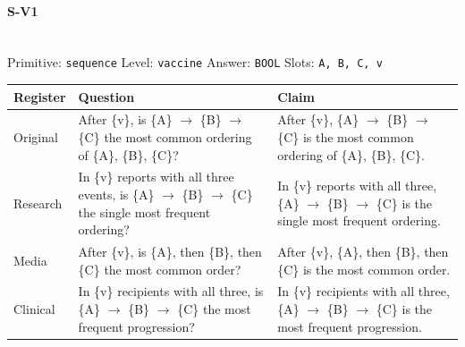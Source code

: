 \documentclass[11pt]{article}
\begin{document}
\paragraph{\textbf{S-V1}}\mbox{}\\
Primitive: \texttt{sequence} \quad Level: \texttt{vaccine} \quad Answer: \texttt{BOOL} \quad Slots: \texttt{A, B, C, v}\\[2pt]
\begin{tabularx}{\linewidth}{@{}l L L@{}}
\toprule
\textbf{Register} & \textbf{Question} & \textbf{Claim} \\
\midrule
Original & After \{v\}, is \{A\} $\rightarrow$  \{B\} $\rightarrow$  \{C\} the most common ordering of \{A\}, \{B\}, \{C\}? & After \{v\}, \{A\} $\rightarrow$  \{B\} $\rightarrow$  \{C\} is the most common ordering of \{A\}, \{B\}, \{C\}. \\
Research & In \{v\} reports with all three events, is \{A\} $\rightarrow$  \{B\} $\rightarrow$  \{C\} the single most frequent ordering? & In \{v\} reports with all three, \{A\} $\rightarrow$  \{B\} $\rightarrow$  \{C\} is the single most frequent ordering. \\
Media & After \{v\}, is \{A\}, then \{B\}, then \{C\} the most common order? & After \{v\}, \{A\}, then \{B\}, then \{C\} is the most common order. \\
Clinical & In \{v\} recipients with all three, is \{A\} $\rightarrow$  \{B\} $\rightarrow$  \{C\} the most frequent progression? & In \{v\} recipients with all three, \{A\} $\rightarrow$  \{B\} $\rightarrow$  \{C\} is the most frequent progression. \\
\bottomrule
\end{tabularx}
\vspace{4pt}
\end{document}
